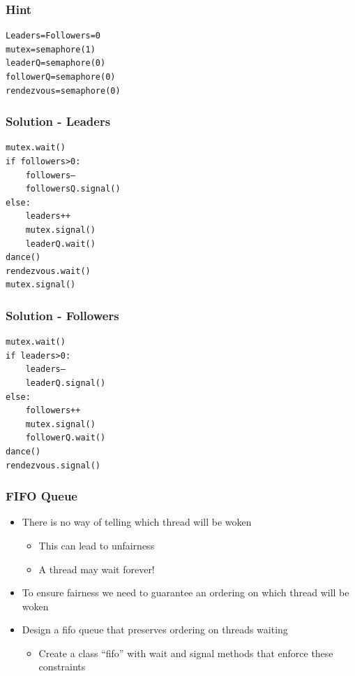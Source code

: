 \documentclass{beamer}
\begin{document}
\begin{frame}[fragile]
	\frametitle{Hint}
\begin{verbatim}
Leaders=Followers=0
mutex=semaphore(1)
leaderQ=semaphore(0)
followerQ=semaphore(0)
rendezvous=semaphore(0)
\end{verbatim}
\end{frame}
\begin{frame}[fragile]
	\frametitle{Solution - Leaders}
\begin{verbatim}
mutex.wait()
if followers>0:
    followers—
    followersQ.signal()
else:
    leaders++
    mutex.signal()
    leaderQ.wait()
dance()
rendezvous.wait()
mutex.signal()
\end{verbatim}
\end{frame}
\begin{frame}[fragile]
	\frametitle{Solution - Followers}
\begin{verbatim}
mutex.wait()
if leaders>0:
    leaders—
    leaderQ.signal()
else:
    followers++
    mutex.signal()
    followerQ.wait()
dance()
rendezvous.signal()
\end{verbatim}
\end{frame}

\begin{frame}[fragile]
	\frametitle{FIFO Queue}
\begin{itemize}
	\item There is no way of telling which thread will be woken
		\begin{itemize}
		\item This can lead to unfairness
		\item A thread may wait forever!
		\end{itemize}
	\item To ensure fairness we need to guarantee an ordering on which thread will be woken
	\item Design a fifo queue that preserves ordering on threads waiting
		\begin{itemize}
		\item Create a class “fifo” with wait and signal methods that enforce these constraints
		\end{itemize}
\end{itemize}
\end{frame}
\end{document}
